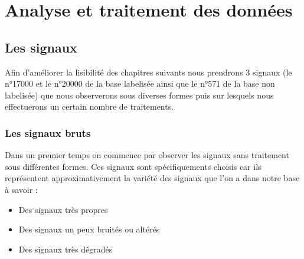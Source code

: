 
\hypertarget{Analyse-et-traitement-des-donnuxe9es}{%
\chapter{Analyse et traitement des données}\label{Analyse-et-traitement-des-donnuxe9es}}

\hypertarget{Les-signaux}{%
\section{Les signaux}
\label{Les-signaux}}

Afin d'améliorer la lisibilité des chapitres suivants nous prendrons 3 signaux (le n°17000 et le n°20000 de la base labelisée ainsi que le n°571 de la base non labelisée) que nous observerons sous diverses formes puis sur lesquels nous effectuerons un certain nombre de traitements.

\hypertarget{Signaux-Bruts}{%
\subsection{Les signaux bruts}
\label{Signaux-Bruts}}

Dans un premier temps on commence par observer les signaux sans traitement sous différentes formes. Ces signaux sont spécifiquements choisis car ils représentent approximativement la variété des signaux que l'on a dans notre base à savoir :
\begin{itemize}
\item Des signaux très propres
\item Des signaux un peux bruités ou altérés
\item Des signaux très dégradés
\end{itemize}

